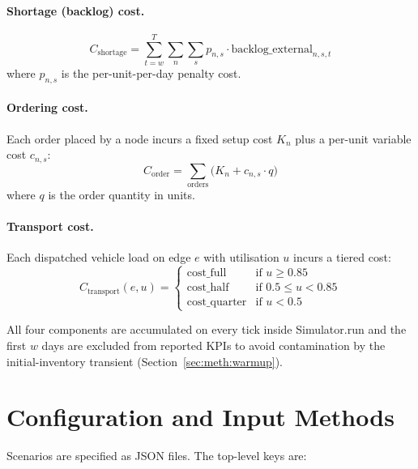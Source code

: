 \paragraph{Shortage (backlog) cost.}
\begin{equation}
  C_{\text{shortage}} = \sum_{t=w}^{T} \sum_{n} \sum_{s}
    p_{n,s} \cdot \text{backlog\_external}_{n,s,t}
\end{equation}
where $p_{n,s}$ is the per-unit-per-day penalty cost.

\paragraph{Ordering cost.}
Each order placed by a node incurs a fixed setup cost $K_n$ plus a
per-unit variable cost $c_{n,s}$:
\begin{equation}
  C_{\text{order}} = \sum_{\text{orders}} \bigl(K_n + c_{n,s} \cdot q\bigr)
\end{equation}
where $q$ is the order quantity in units.

\paragraph{Transport cost.}
Each dispatched vehicle load on edge $e$ with utilisation $u$ incurs
a tiered cost:
\begin{equation}
  C_{\text{transport}}(e, u) =
  \begin{cases}
    \text{cost\_full}    & \text{if } u \geq 0.85 \\
    \text{cost\_half}    & \text{if } 0.5 \leq u < 0.85 \\
    \text{cost\_quarter} & \text{if } u < 0.5
  \end{cases}
\end{equation}

All four components are accumulated on every tick inside
Simulator.run and the first $w$ days are excluded from reported
KPIs to avoid contamination by the initial-inventory transient
(Section~\ref{sec:meth:warmup}).

\section{Configuration and Input Methods}
\label{sec:arch:config}

Scenarios are specified as JSON files.  The top-level keys are:

